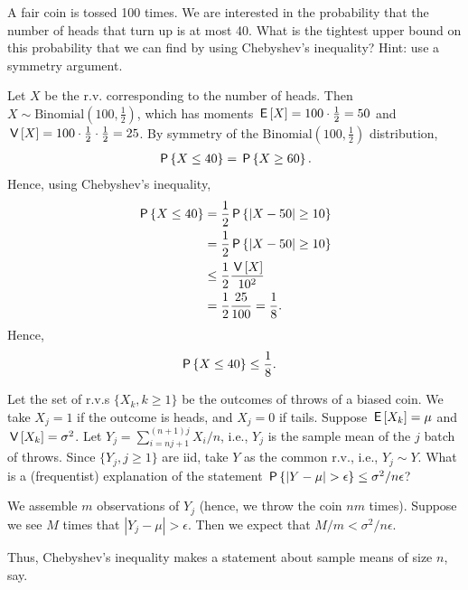 \begin{exercise}
A fair coin is tossed 100 times. We are interested in the probability that the number of heads that turn up is at most 40. What is the tightest upper bound on this probability that we can find by using Chebyshev's inequality? Hint: use a symmetry argument.
\begin{solution}
Let $X$ be the r.v. corresponding to the number of heads. Then $X\sim \text{Binomial}\left(100,\frac12\right)$, which has moments $\E{X} = 100 \cdot \frac{1}{2} = 50$ and $\V{X} = 100 \cdot \frac{1}{2} \cdot \frac{1}{2} = 25$. By symmetry of the $\text{Binomial}\left(100,\frac12\right)$ distribution,
\begin{align}
    \P{ X \leq 40} = \P{ X \geq 60 }.
\end{align}
Hence, using Chebyshev's inequality,
\begin{align}
    \P{ X \leq 40} &= \frac{1}{2}  \P{ |X - 50| \geq 10 } \\
    &= \frac{1}{2} \P{ |X - 50| \geq 10 } \\
    &\leq \frac{1}{2} \frac{\V{X}}{10^2} \\
    &= \frac{1}{2} \frac{25}{100} = \frac{1}{8}.
\end{align}
Hence,
\begin{align}
    \P{ X \leq 40} &\leq \frac{1}{8}.
\end{align}
\end{solution}
\end{exercise}


\begin{exercise}\label{ex:13-1}
Let the set of r.v.s $\{X_{k}, k\geq 1\}$ be the outcomes of throws of a biased coin. We take $X_{j}=1$ if the outcome is heads, and $X_{j}=0$ if tails. Suppose $\E{X_{k}} = \mu$ and $\V{X_{k}} = \sigma^{2}$.
Let $Y_{j} = \sum_{i=n j + 1}^{(n+1)j} X_{i}/n$, i.e., $Y_{j}$ is the sample mean of the $j$ batch of throws. Since $\{Y_{j}, j\geq 1\}$ are iid, take $Y$ as the common r.v., i.e., $Y_{j} \sim Y$.
What is a (frequentist) explanation of the statement $\P{|Y-\mu|>\epsilon} \leq \sigma^{2}/n \epsilon$?
\begin{solution}
  We assemble $m$ observations of $Y_{j}$ (hence, we throw the coin $n m$ times).
  Suppose we see $M$ times that $|Y_{j} - \mu|> \epsilon$. Then we expect that $M/m < \sigma^{2}/n\epsilon$.

Thus,  Chebyshev's inequality makes a statement about sample means of size $n$, say.
\end{solution}
\end{exercise}


